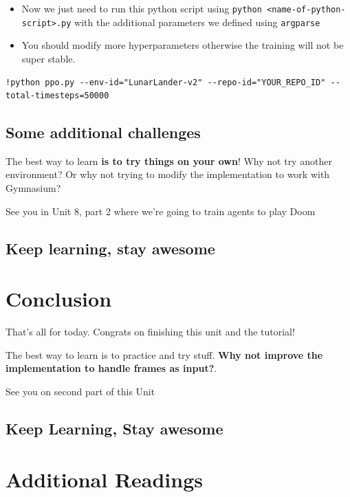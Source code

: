 \documentclass[11pt,a4paper]{article}
\begin{document}
\begin{itemize}
\item
  Now we just need to run this python script using \texttt{python\ \textless{}name-of-python-script\textgreater{}.py} with the additional parameters we defined using \texttt{argparse}
\item
  You should modify more hyperparameters otherwise the training will not be super stable.
\end{itemize}

\begin{lstlisting}
!python ppo.py --env-id="LunarLander-v2" --repo-id="YOUR_REPO_ID" --total-timesteps=50000
\end{lstlisting}

\subsection{Some additional challenges}\label{some-additional-challenges}

The best way to learn \textbf{is to try things on your own}! Why not try another environment? Or why not trying to modify the implementation to work with Gymnasium?

See you in Unit 8, part 2 where we're going to train agents to play Doom

\subsection{Keep learning, stay awesome}\label{keep-learning-stay-awesome}

\section{Conclusion}\label{conclusion}

That's all for today. Congrats on finishing this unit and the tutorial!

The best way to learn is to practice and try stuff. \textbf{Why not improve the implementation to handle frames as input?}.

See you on second part of this Unit

\subsection{Keep Learning, Stay awesome}\label{keep-learning-stay-awesome-1}

\section{Additional Readings}\label{additional-readings}
\end{document}
